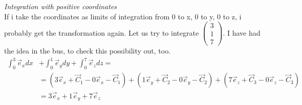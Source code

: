 \documentclass[a4paper]{article}
\begin{document}



\emph{Integration with positive coordinates}\\

If i take the coordinates as limits of integration from 0 to x, 0 to y, 0 to z, i probably get the transformation again.
Let us try to integrate $\begin{pmatrix}3\\1\\7\end{pmatrix}$. I have had the idea in the bus, to check this possibility out, too.\\

\begin{displaymath}
\begin{align}
\int_{0}^{3}\vec{e}_{x}dx &+
\int_{0}^{1}\vec{e}_{y}dy +
\int_{0}^{7}\vec{e}_{z}dz =\\
&= (3\vec{e}_{x}+\vec{C}_{1}-0\vec{e}_{x}-\vec{C}_{1}) + (1\vec{e}_{y}+\vec{C}_{2}-0\vec{e}_{y}-\vec{C}_{2}) + (7\vec{e}_{z}+\vec{C}_{3}-0\vec{e}_{z}-\vec{C}_{3})\\
&= 3\vec{e}_{x} + 1\vec{e}_{y} + 7\vec{e}_{z}\\
\end{align}
\end{displaymath}
\end{document}
